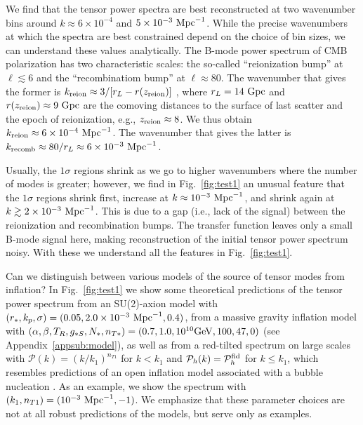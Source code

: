 \documentclass[tightenlines,floats,aps,nofootinbib,prd,onecolumn,preprintnumbers]{revtex4}
\newcommand{\PP}{\mathcal{P}}
\begin{document}
We find that the tensor power spectra are best
reconstructed at two wavenumber bins around $k\approx 6\times 10^{-4}$
and $5\times 10^{-3}~{\rm Mpc}^{-1}$. While the precise wavenumbers at
which the spectra are best constrained depend on the choice of bin
sizes, we can understand these values analytically. The B-mode power
spectrum of CMB polarization has two characteristic scales: the
so-called ``reionization bump'' at $\ell\lesssim 6$ and the
``recombinatiom bump'' at $\ell\approx 80$. The wavenumber that gives
the former is $k_{\rm reion}\approx 3/[r_L-r(z_{\rm reion})]$
\cite{Zaldarriaga:1996ke}, where $r_L=14~{\rm Gpc}$ and
$r(z_{\rm reion})\approx 9~{\rm Gpc}$ are the comoving distances to the
surface of last scatter and the epoch of reionization, e.g., $z_{\rm
reion}\approx 8$. We thus obtain $k_{\rm reion}\approx 6\times
10^{-4}~{\rm Mpc}^{-1}$. The wavenumber that gives the latter is
$k_{\rm recomb}\approx 80/r_L\approx 6\times 10^{-3}~{\rm Mpc}^{-1}$.

Usually, the $1\sigma$ regions shrink as we go to higher wavenumbers
where the number of modes is greater; however, we find in
Fig.~\ref{fig:test1} an unusual feature that the $1\sigma$ regions
shrink first, increase at $k\approx 10^{-3}~{\rm Mpc}^{-1}$, and shrink
again at $k\gtrsim 2\times 10^{-3}~{\rm Mpc}^{-1}$. This is due to a gap
(i.e., lack of the signal) between the reionization and recombination
bumps. The transfer function leaves only a small B-mode signal here,
making reconstruction of the initial tensor power spectrum noisy. With
these we understand all the features in Fig.~\ref{fig:test1}.

Can we distinguish between various models of the source of tensor modes
from inflation? In Fig.~\ref{fig:test1} we show some theoretical
predictions of the tensor power spectrum from an SU(2)-axion model with
$(r_*,k_p,\sigma)=(0.05, 2.0\times 10^{-3}~{\rm Mpc}^{-1},0.4)$, from a
massive gravity inflation model with 
$(\alpha,\beta,T_R,g_{*S},N_*,n_{T*})=(0.7,1.0,10^{10}{\rm GeV},100,47,0)$
(see Appendix~\ref{appsub:model}), as well as from a red-tilted spectrum
on large scales with $\PP(k)=(k/k_1)^{n_{T1}}$ for $k<k_1$ and
$\PP_h(k)=\PP_h^{\rm fid}$ for $k\leq k_1$, which resembles predictions
of an open inflation model associated with
a bubble nucleation \cite{Yamauchi:2011qq}. As an example, we show the
spectrum with $(k_1,n_{T1})=(10^{-3}~{\rm Mpc}^{-1},-1)$.
We emphasize that these parameter choices are not at all
robust predictions of the models, but serve only as examples.
\end{document}
